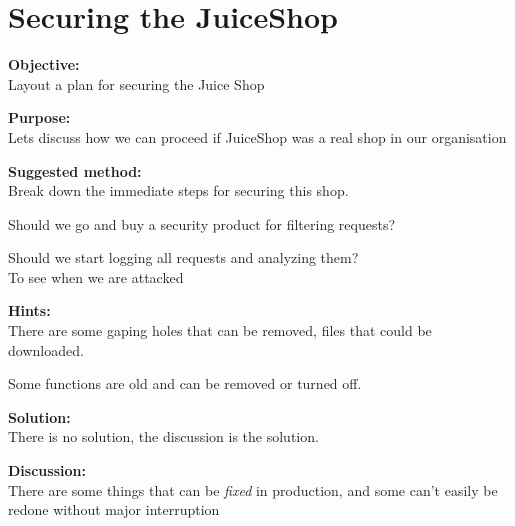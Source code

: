 \documentclass[a4paper,11pt,notitlepage]{report}
\begin{document}
\chapter{Securing the JuiceShop}
\label{ex:secure-juiceshop}


{\bf Objective:}\\
Layout a plan for securing the Juice Shop

{\bf Purpose:}\\
Lets discuss how we can proceed if JuiceShop was a real shop in our organisation

{\bf Suggested method:}\\
Break down the immediate steps for securing this shop.

Should we go and buy a security product for filtering requests?

Should we start logging all requests and analyzing them?\\
To see when we are attacked

{\bf Hints:}\\
There are some gaping holes that can be removed, files that could be downloaded.

Some functions are old and can be removed or turned off.

{\bf Solution:}\\
There is no solution, the discussion is the solution.

{\bf Discussion:}\\
There are some things that can be \emph{fixed} in production, and some can't easily be redone without major interruption
\end{document}
